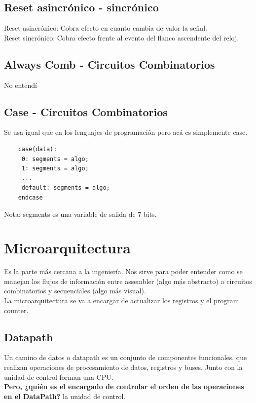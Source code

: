 \documentclass[10pt,a4paper]{article}
\begin{document}
\subsection*{Reset asincrónico - sincrónico}
Reset asincrónico: Cobra efecto en cuanto cambia de valor la señal. \\ 
Reset sincrónico: Cobra efecto frente al evento del flanco ascendente del reloj.
\subsection*{Always Comb - Circuitos Combinatorios}
No entendí
\subsection*{Case - Circuitos Combinatorios}
Se usa igual que en los lenguajes de programación pero acá es simplemente case.
\begin{lstlisting}
    case(data):
     0: segments = algo;
     1: segments = algo; 
     ...
     default: segments = algo; 
    endcase
\end{lstlisting}
Nota: segments es una variable de salida de 7 bits.
\section*{Microarquitectura}
Es la parte más cercana a la ingeniería. Nos sirve para poder entender como se manejan los flujos de información entre assembler (algo más abstracto) a circuitos combinatorios y secuenciales (algo más visual). \\
La microarquitectura se va a encargar de actualizar los registros y el program counter. \\

\subsection*{Datapath}
Un camino de datos o datapath es un conjunto de componentes funcionales, que realizan operaciones de procesamiento de datos, registros y buses. Junto con la unidad de control forman una CPU. \\
\textbf{Pero, ¿quién es el encargado de controlar el orden de las operaciones en el DataPath?} la unidad de control. \\  
\end{document}

